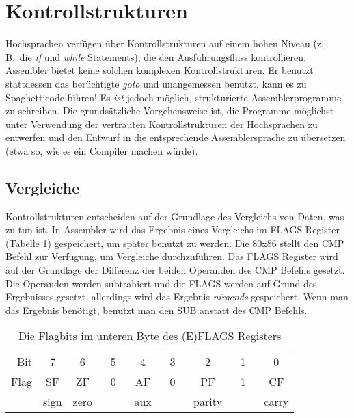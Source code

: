 \section{Kontrollstrukturen}
\label{sec:control}

Hochsprachen verf\"{u}gen \"{u}ber Kontrollstrukturen auf einem hohen Niveau
(z.\,B.\ die \emph{if} und \emph{while} Statements), die den
Ausf\"{u}hrungsfluss kontrollieren. Assembler bietet keine solchen
komplexen Kontrollstrukturen. Er benutzt stattdessen das ber\"{u}chtigte
\emph{goto} und unangemessen benutzt, kann es zu Spaghetticode
f\"{u}hren! Es \emph{ist} jedoch m\"{o}glich, strukturierte
Assemblerprogramme zu schreiben. Die grunds\"{a}tzliche Vorgehensweise
ist, die Programme m\"{o}glichst unter Verwendung der vertrauten
Kontrollstrukturen der Hochsprachen zu entwerfen und den Entwurf in
die entsprechende Assemblersprache zu \"{u}bersetzen (etwa so, wie es
ein Compiler machen w\"{u}rde).

\subsection{Vergleiche  }

 Kontrollstrukturen entscheiden auf der
Grundlage des Vergleichs von Daten, was zu tun ist. In Assembler
wird das Ergebnis eines Vergleichs im FLAGS Register (Tabelle
\ref{tab:FLAGS}) gespeichert, um sp\"{a}ter benutzt zu werden. Die 80x86
stellt den {\code CMP} Befehl zur Verf\"{u}gung, um Vergleiche
durchzuf\"{u}hren. Das FLAGS Register wird auf der Grundlage der
Differenz der beiden Operanden des {\code CMP} Befehls gesetzt. Die
Operanden werden subtrahiert und die FLAGS werden auf Grund des
Ergebnisses gesetzt, allerdings wird das Ergebnis \emph{nirgends}
gespeichert. Wenn man das Ergebnis ben\"{o}tigt, benutzt man den {\code
SUB} anstatt des {\code CMP} Befehls.

\begin{table}[ht]
\center
 \begin {tabular}{r|c|c|c|c|c|c|c|c|}
 \cline{2-9}
 Bit  &   7  &   6  &    5    &  4  &    3    &    2   &    1    &   0  \\
 \cline{2-9}
 Flag &  SF  &  ZF  & \,~0~\, &  AF & \,~0~\, &   PF   & \,~1~\, &  CF  \\
 \cline{2-9}
      & sign & zero &         & aux &         & parity &         & carry\\
 \cline{2-9}
 \end{tabular}
\caption{Die Flagbits im unteren Byte des (E)FLAGS Registers \label{tab:FLAGS}}       %
\end{table}


